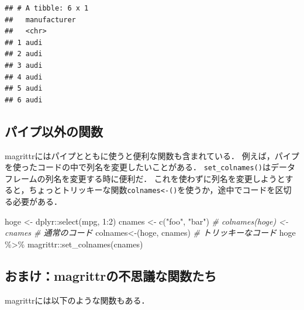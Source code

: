 \documentclass[
]{article}
\newenvironment{Shaded}{\begin{snugshade}}{\end{snugshade}}
\newcommand{\AttributeTok}[1]{\textcolor[rgb]{0.77,0.63,0.00}{#1}}
\newcommand{\CommentTok}[1]{\textcolor[rgb]{0.56,0.35,0.01}{\textit{#1}}}
\newcommand{\DecValTok}[1]{\textcolor[rgb]{0.00,0.00,0.81}{#1}}
\newcommand{\FunctionTok}[1]{\textcolor[rgb]{0.00,0.00,0.00}{#1}}
\newcommand{\NormalTok}[1]{#1}
\newcommand{\OtherTok}[1]{\textcolor[rgb]{0.56,0.35,0.01}{#1}}
\newcommand{\SpecialCharTok}[1]{\textcolor[rgb]{0.00,0.00,0.00}{#1}}
\newcommand{\StringTok}[1]{\textcolor[rgb]{0.31,0.60,0.02}{#1}}
\begin{document}
\begin{verbatim}
## # A tibble: 6 x 1
##   manufacturer
##   <chr>       
## 1 audi        
## 2 audi        
## 3 audi        
## 4 audi        
## 5 audi        
## 6 audi
\end{verbatim}

\hypertarget{ux30d1ux30a4ux30d7ux4ee5ux5916ux306eux95a2ux6570}{%
\subsection{パイプ以外の関数}\label{ux30d1ux30a4ux30d7ux4ee5ux5916ux306eux95a2ux6570}}

magrittrにはパイプとともに使うと便利な関数も含まれている．
例えば，パイプを使ったコードの中で列名を変更したいことがある．
\texttt{set\_colnames()}はデータフレームの列名を変更する時に便利だ．
これを使わずに列名を変更しようとすると，ちょっとトリッキーな関数\texttt{colnames\textless{}-()}を使うか，途中でコードを区切る必要がある．

\begin{Shaded}
\begin{Highlighting}[]
\NormalTok{hoge }\OtherTok{\textless{}{-}}\NormalTok{ dplyr}\SpecialCharTok{::}\FunctionTok{select}\NormalTok{(mpg, }\DecValTok{1}\SpecialCharTok{:}\DecValTok{2}\NormalTok{)}
\NormalTok{cnames }\OtherTok{\textless{}{-}} \FunctionTok{c}\NormalTok{(}\StringTok{"foo"}\NormalTok{, }\StringTok{"bar"}\NormalTok{)}
 \CommentTok{\# colnames(hoge) \textless{}{-} cnames      \# 通常のコード}
\StringTok{\textasciigrave{}}\AttributeTok{colnames\textless{}{-}}\StringTok{\textasciigrave{}}\NormalTok{(hoge, cnames)       }\CommentTok{\# トリッキーなコード}
\NormalTok{hoge }\SpecialCharTok{\%\textgreater{}\%} 
\NormalTok{  magrittr}\SpecialCharTok{::}\FunctionTok{set\_colnames}\NormalTok{(cnames)}
\end{Highlighting}
\end{Shaded}

\hypertarget{ux304aux307eux3051magrittrux306eux4e0dux601dux8b70ux306aux95a2ux6570ux305fux3061}{%
\subsection{おまけ：magrittrの不思議な関数たち}\label{ux304aux307eux3051magrittrux306eux4e0dux601dux8b70ux306aux95a2ux6570ux305fux3061}}

magrittrには以下のような関数もある．
\end{document}
